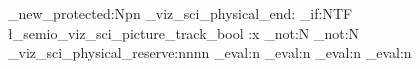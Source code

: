 \cs_new_protected:Npn \semio_viz_sci_physical_end:
  {
    \bool_if:NTF \l_semio_viz_sci_picture_track_bool
      {
        \use:x
          {
            \exp_not:N \endpgflowlevelscope
            \exp_not:N \semio_viz_sci_physical_reserve:nnnn
              { \dim_eval:n { \pgf@picminx } } { \dim_eval:n { \pgf@picmaxx } }
              { \dim_eval:n { \pgf@picminy } } { \dim_eval:n { \pgf@picmaxy } }
          }
      }
      { \endpgflowlevelscope }
  }
